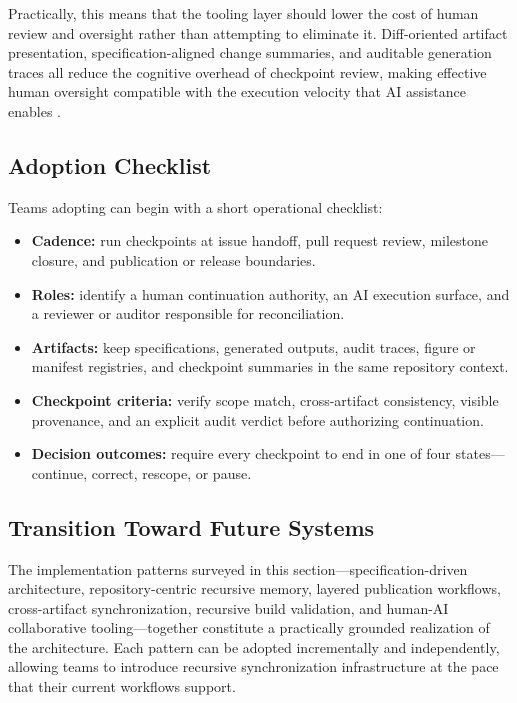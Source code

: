 Practically, this means that the tooling layer should lower the cost of human review and oversight rather than attempting to eliminate it. Diff-oriented artifact presentation, specification-aligned change summaries, and auditable generation traces all reduce the cognitive overhead of checkpoint review, making effective human oversight compatible with the execution velocity that AI assistance enables \cite{Simon1957ModelsMan}.

\subsection{Adoption Checklist}

Teams adopting  can begin with a short operational checklist:
\begin{itemize}
  \item \textbf{Cadence:} run checkpoints at issue handoff, pull request review, milestone closure, and publication or release boundaries.
  \item \textbf{Roles:} identify a human continuation authority, an AI execution surface, and a reviewer or auditor responsible for reconciliation.
  \item \textbf{Artifacts:} keep specifications, generated outputs, audit traces, figure or manifest registries, and checkpoint summaries in the same repository context.
  \item \textbf{Checkpoint criteria:} verify scope match, cross-artifact consistency, visible provenance, and an explicit audit verdict before authorizing continuation.
  \item \textbf{Decision outcomes:} require every checkpoint to end in one of four states---continue, correct, rescope, or pause.
\end{itemize}

\subsection{Transition Toward Future Systems}

The implementation patterns surveyed in this section---specification-driven architecture, repository-centric recursive memory, layered publication workflows, cross-artifact synchronization, recursive build validation, and human-AI collaborative tooling---together constitute a practically grounded realization of the  architecture. Each pattern can be adopted incrementally and independently, allowing teams to introduce recursive synchronization infrastructure at the pace that their current workflows support.

